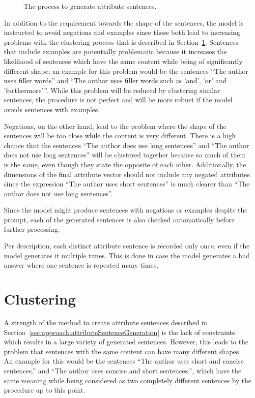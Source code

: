\begin{figure}[ht]
  
  \caption{The process to generate attribute sentences.}
  \label{fig:attributeSentenceGeneration}
\end{figure}

In addition to the requirement towards the shape of the sentences, the model is instructed to avoid negations and examples since these both lead to increasing problems with the clustering process that is described in Section~\ref{sec:approach:clustering}.
Sentences that include examples are potentially problematic because it increases the likelihood of sentences which have the same content while being of significantly different shape; an example for this problem would be the sentences \enquote{The author uses filler words} and \enquote{The author uses filler words such as 'and', 'or' and 'furthermore'}. While this problem will be reduced by clustering similar sentences, the procedure is not perfect and will be more robust if the model avoids sentences with examples.

Negations, on the other hand, lead to the problem where the shape of the sentences will be too close while the content is very different. There is a high chance that the sentences \enquote{The author does use long sentences} and \enquote{The author does not use long sentences} will be clustered together because so much of them is the same, even though they state the opposite of each other.
Additionally, the dimensions of the final attribute vector should not include any negated attributes since the expression \enquote{The author uses short sentences} is much clearer than \enquote{The author does not use long sentences}.

Since the model might produce sentences with negations or examples despite the prompt, each of the generated sentences is also checked automatically before further processing.

Per description, each distinct attribute sentence is recorded only once, even if the model generates it multiple times. This is done in case the model generates a bad answer where one sentence is repeated many times.


\section{Clustering}
\label{sec:approach:clustering}
A strength of the method to create attribute sentences described in Section~\ref{sec:approach:attributeSentenceGeneration} is the lack of constraints which results in a large variety of generated sentences. However, this leads to the problem that sentences with the same content can have many different shapes. An example for this would be the sentences \enquote{The author uses short and concise sentences.} and \enquote{The author uses concise and short sentences.}, which have the same meaning while being considered as two completely different sentences by the procedure up to this point.

